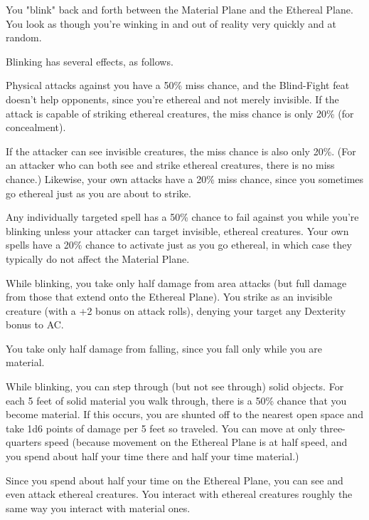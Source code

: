 \begin{multicols}{2}
\begin{small}
\noindent You "blink" back and forth between the Material Plane and the Ethereal Plane. You look as though you're winking in and out of reality very quickly and at random.

\smallskip\noindent Blinking has several effects, as follows.

\smallskip\noindent Physical attacks against you have a 50\% miss chance, and the Blind-Fight feat doesn't help opponents, since you're ethereal and not merely invisible. If the attack is capable of striking ethereal creatures, the miss chance is only 20\% (for concealment).

\smallskip\noindent If the attacker can see invisible creatures, the miss chance is also only 20\%. (For an attacker who can both see and strike ethereal creatures, there is no miss chance.) Likewise, your own attacks have a 20\% miss chance, since you sometimes go ethereal just as you are about to strike.

\smallskip\noindent Any individually targeted spell has a 50\% chance to fail against you while you're blinking unless your attacker can target invisible, ethereal creatures. Your own spells have a 20\% chance to activate just as you go ethereal, in which case they typically do not affect the Material Plane.

\smallskip\noindent While blinking, you take only half damage from area attacks (but full damage from those that extend onto the Ethereal Plane). You strike as an invisible creature (with a +2 bonus on attack rolls), denying your target any Dexterity bonus to AC.

\smallskip\noindent You take only half damage from falling, since you fall only while you are material.

\smallskip\noindent While blinking, you can step through (but not see through) solid objects. For each 5 feet of solid material you walk through, there is a 50\% chance that you become material. If this occurs, you are shunted off to the nearest open space and take 1d6 points of damage per 5 feet so traveled. You can move at only three-quarters speed (because movement on the Ethereal Plane is at half speed, and you spend about half your time there and half your time material.)

\smallskip\noindent Since you spend about half your time on the Ethereal Plane, you can see and even attack ethereal creatures. You interact with ethereal creatures roughly the same way you interact with material ones.


\end{small}
\end{multicols}
